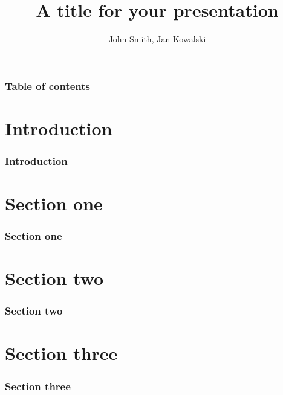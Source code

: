 \documentclass{beamer}
\title[Short title]{A title for your presentation}
\author[Smith, Kowalski]{\underline{John Smith}, Jan Kowalski}
\institute[MSW] {The Ministry of Silly Walks}
\begin{document}
\begin{frame}
  \titlepage
\end{frame}

\begin{frame}
  \frametitle{Table of contents}
  \tableofcontents
\end{frame}

\section[Intro]{Introduction}
\begin{frame}
  \frametitle{Introduction}
\end{frame}

\section[Sec 1]{Section one}
\begin{frame}
  \frametitle{Section one}
\end{frame}

\section[Sec 2]{Section two}
\begin{frame}
  \frametitle{Section two}
\end{frame}

\section[Sec 3]{Section three}
\begin{frame}
  \frametitle{Section three}
\end{frame}
\end{document}
